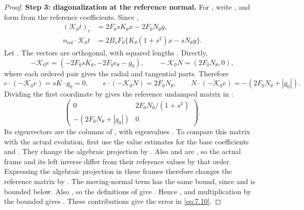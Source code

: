\begin{proof}
\textbf{Step 3: diagonalization at the reference normal.}
For , write , and form  from the reference coefficients. Since ,
\begin{align*}
(\mathcal K_0t)_r&=2F_0sK_\theta x-2F_0N_\theta y,\\
n_{\mathrm{ref}}\cdot\mathcal K_0t&=2B_sF_0\{K_\theta(1+s^2)x-sN_\theta y\}.
\end{align*}
Let . The vectors  are orthogonal, with squared lengths . Directly,
\[
-\mathcal K_0e=(-2F_0sK_\theta,-2F_0e_\theta-g_0),
\qquad
-\mathcal K_0N=(2F_0N_\theta,0),
\]
where each ordered pair gives the radial and tangential parts. Therefore
\[
e\cdot(-\mathcal K_0e)=sK\cdot g_0=0,\qquad
e\cdot(-\mathcal K_0N)=2F_0N_\theta,\qquad
N\cdot(-\mathcal K_0e)=-(2F_0N_\theta+|g_0|).
\]
Dividing the first coordinate by  gives the reference undamped matrix in :
\[
\begin{pmatrix}
0&2F_0N_\theta/(1+s^2)\\
-(2F_0N_\theta+|g_0|)&0
\end{pmatrix}.
\]
Its eigenvectors are the columns of , with eigenvalues . To compare this matrix with
the actual evolution, first use the value estimates for the base coefficients and . They
change the algebraic projection  by . Also  and  are
, so the actual frame and its left inverse differ from their reference values by that
order. Expressing the algebraic projection in these frames therefore changes the reference
matrix by . The moving-normal term  has the same bound, since
 and  is bounded below. Also , so the definitions of  give
. Hence , and multiplication by the bounded
 gives . These contributions give the error  in \eqref{eq:7.10}.


\end{proof}
